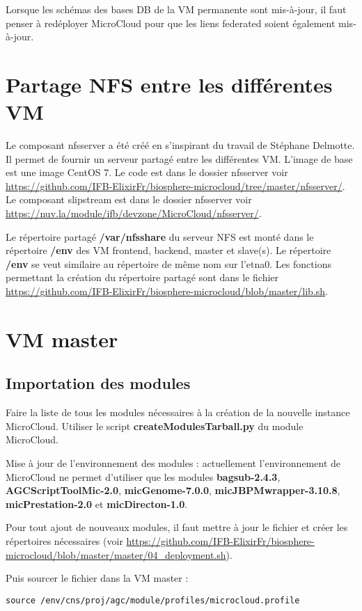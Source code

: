 \begin{mycolorbox}
	Lorsque les schémas des bases DB de la VM permanente sont mis-à-jour, il faut penser à redéployer MicroCloud pour que les liens federated soient également mis-à-jour.
\end{mycolorbox}

\section{Partage NFS entre les différentes VM}

\label{nfsserver} Le composant nfsserver a été créé en s'inspirant du travail de Stéphane Delmotte.
Il permet de fournir un serveur partagé entre les différentes VM.
L'image de base est une image CentOS 7.
Le code est dans le dossier nfsserver voir  \url{https://github.com/IFB-ElixirFr/biosphere-microcloud/tree/master/nfsserver/}.
Le composant slipstream est dans le dossier nfsserver voir
\url{https://nuv.la/module/ifb/devzone/MicroCloud/nfsserver/}.

Le répertoire partagé \textbf{/var/nfsshare} du serveur NFS est monté dans le répertoire \textbf{/env}
des VM frontend, backend, master et slave(s).
Le répertoire \textbf{/env} se veut similaire au répertoire de même nom sur l’etna0. 
Les fonctions permettant la création du répertoire partagé sont dans le fichier \url{https://github.com/IFB-ElixirFr/biosphere-microcloud/blob/master/lib.sh}.

\section{VM master}

\subsection{Importation des modules}
Faire la liste de tous les modules nécessaires à la création de la nouvelle instance MicroCloud.
Utiliser le script \textbf{createModulesTarball.py} du module MicroCloud.

Mise à jour de l'environnement des modules :
actuellement l'environnement de MicroCloud ne permet d'utiliser que les modules \textbf{bagsub-2.4.3}, \textbf{AGCScriptToolMic-2.0}, \textbf{micGenome-7.0.0}, \textbf{micJBPMwrapper-3.10.8}, \textbf{micPrestation-2.0} et \textbf{micDirecton-1.0}.
\newline

\begin{mycolorbox}
	Pour tout ajout de nouveaux modules, il faut mettre à jour le fichier  et créer les répertoires nécessaires (voir \url{https://github.com/IFB-ElixirFr/biosphere-microcloud/blob/master/master/04_deployment.sh}).
\end{mycolorbox}

Puis sourcer le fichier  dans la VM master :
\begin{lstlisting}[style=bash]
source /env/cns/proj/agc/module/profiles/microcloud.profile
\end{lstlisting}

